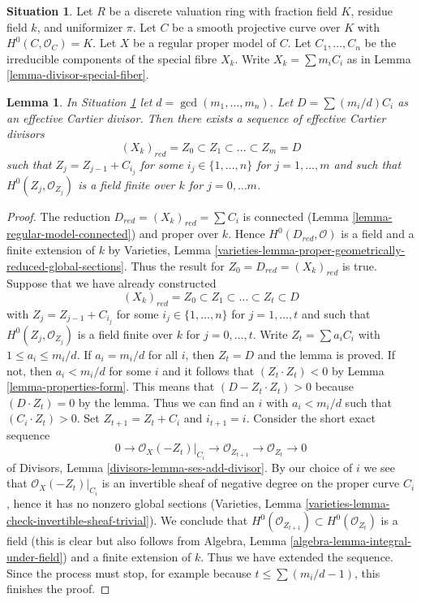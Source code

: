 \documentclass[10pt,a4paper]{amsart}
\theoremstyle{plain}
\newtheorem{lemma}[subsection]{Lemma}
\theoremstyle{definition}
\newtheorem{situation}[subsection]{Situation}
\theoremstyle{remark}
\numberwithin{equation}{subsection}
\newenvironment{reference}{}{}
\begin{document}
\begin{situation}
\label{situation-regular-model}
Let $R$ be a discrete valuation ring with fraction field $K$,
residue field $k$, and uniformizer $\pi$.
Let $C$ be a smooth projective curve over $K$ with $H^0(C, \mathcal{O}_C) = K$.
Let $X$ be a regular proper model of $C$.
Let $C_1, \ldots, C_n$ be the irreducible components of the special
fibre $X_k$. Write $X_k = \sum m_i C_i$ as in
Lemma \ref{lemma-divisor-special-fiber}.
\end{situation}

\begin{lemma}
\label{lemma-regular-model-field}
\begin{reference}
\cite[Lemma 2.6]{Artin-Winters}
\end{reference}
In Situation \ref{situation-regular-model} let $d = \gcd(m_1, \ldots, m_n)$.
Let $D = \sum (m_i/d) C_i$ as an effective Cartier divisor. Then there exists
a sequence of effective Cartier divisors
$$
(X_k)_{red} = Z_0 \subset Z_1 \subset \ldots \subset Z_m = D
$$
such that $Z_j = Z_{j - 1} + C_{i_j}$ for some $i_j \in \{1, \ldots, n\}$
for $j = 1, \ldots, m$ and such that $H^0(Z_j, \mathcal{O}_{Z_j})$
is a field finite over $k$ for $j = 0, \ldots m$.
\end{lemma}

\begin{proof}
The reduction $D_{red} = (X_k)_{red} = \sum C_i$ is connected
(Lemma \ref{lemma-regular-model-connected}) and proper over $k$. Hence
$H^0(D_{red}, \mathcal{O})$ is a field and a finite extension of
$k$ by Varieties, Lemma
\ref{varieties-lemma-proper-geometrically-reduced-global-sections}.
Thus the result for $Z_0 = D_{red} = (X_k)_{red}$ is true.
Suppose that we have already constructed
$$
(X_k)_{red} = Z_0 \subset Z_1 \subset \ldots \subset Z_t \subset D
$$
with $Z_j = Z_{j - 1} + C_{i_j}$ for some $i_j \in \{1, \ldots, n\}$
for $j = 1, \ldots, t$ and such that $H^0(Z_j, \mathcal{O}_{Z_j})$
is a field finite over $k$ for $j = 0, \ldots, t$.
Write $Z_t = \sum a_i C_i$ with $1 \leq a_i \leq m_i/d$.
If $a_i = m_i/d$ for all $i$, then $Z_t = D$ and the lemma is proved.
If not, then $a_i < m_i/d$ for some $i$ and it follows that
$(Z_t \cdot Z_t) < 0$ by Lemma \ref{lemma-properties-form}. This means that
$(D - Z_t \cdot Z_t) > 0$ because $(D \cdot Z_t) = 0$ by the lemma.
Thus we can find an $i$ with $a_i < m_i/d$ such that
$(C_i \cdot Z_t) > 0$. Set $Z_{t + 1} = Z_t + C_i$ and $i_{t + 1} = i$.
Consider the short exact sequence
$$
0 \to \mathcal{O}_X(-Z_t)|_{C_i} \to \mathcal{O}_{Z_{t + 1}} \to
\mathcal{O}_{Z_t} \to 0
$$
of Divisors, Lemma \ref{divisors-lemma-ses-add-divisor}.
By our choice of $i$ we see that
$\mathcal{O}_X(-Z_t)|_{C_i}$ is an invertible sheaf of negative degree
on the proper curve $C_i$, hence it has no nonzero global sections
(Varieties, Lemma \ref{varieties-lemma-check-invertible-sheaf-trivial}).
We conclude that $H^0(\mathcal{O}_{Z_{t + 1}}) \subset H^0(\mathcal{O}_{Z_t})$
is a field (this is clear but also follows from
Algebra, Lemma \ref{algebra-lemma-integral-under-field})
and a finite extension of $k$. Thus we have extended the sequence.
Since the process must stop, for example because $t \leq \sum (m_i/d - 1)$,
this finishes the proof.
\end{proof}
\end{document}
